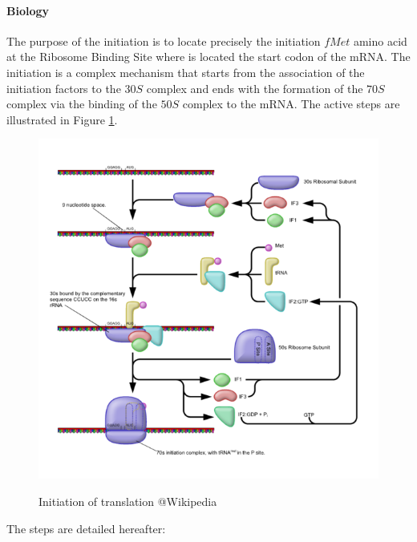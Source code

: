 \paragraph{Biology} The purpose of the initiation is to locate precisely the initiation $fMet$ amino acid at the Ribosome Binding Site where is located the start codon of the mRNA. The initiation is a complex mechanism that starts from the association of the initiation factors to the $30S$ complex and ends with the formation of the $70S$ complex via the binding of the $50S$ complex to the mRNA. The active steps are illustrated in Figure \ref{fig:initTranslate}.
\begin{figure}[hbtp]
  \centering
  \includegraphics[width=15cm]{figure/prokaryoticTranslationInitiationFromWikibooks.png}\\
  \caption{Initiation of translation @Wikipedia}\label{fig:initTranslate}
\end{figure}
The steps are detailed hereafter:
